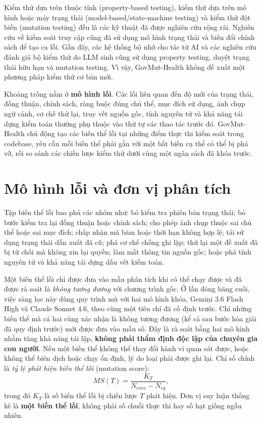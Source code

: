 \documentclass[11pt]{article}
\begin{document}
Kiểm thử dựa trên thuộc tính (property-based testing), kiểm thử dựa trên mô hình hoặc máy trạng thái (model-based/state-machine testing) và kiểm thử đột biến (mutation testing) đều là các kỹ thuật đã được nghiên cứu rộng rãi. Nghiên cứu về kiểm soát truy cập cũng đã sử dụng mô hình trạng thái và biến đổi chính sách để tạo ca lỗi. Gần đây, các hệ thống bộ nhớ cho tác tử AI và các nghiên cứu đánh giá bộ kiểm thử do LLM sinh cũng sử dụng property testing, duyệt trạng thái hữu hạn và mutation testing. Vì vậy, GovMut-Health không đề xuất một phương pháp kiểm thử cơ bản mới.

Khoảng trống nằm ở \textbf{mô hình lỗi}. Các lỗi liên quan đến độ mới của trạng thái, đồng thuận, chính sách, ràng buộc đúng chủ thể, mục đích sử dụng, ảnh chụp ngữ cảnh, cơ chế thử lại, truy vết nguồn gốc, tính nguyên tử và khả năng tái dựng kiểm toán thường phụ thuộc vào thứ tự các thao tác trước đó. GovMut-Health chủ động tạo các biến thể lỗi tại những điểm thực thi kiểm soát trong codebase, yêu cầu mỗi biến thể phải gắn với một bất biến cụ thể có thể bị phá vỡ, rồi so sánh các chiến lược kiểm thử dưới cùng một ngân sách đã khóa trước.

\section{Mô hình lỗi và đơn vị phân tích}
Tập biến thể lỗi bao phủ các nhóm như: bỏ kiểm tra phiên bản trạng thái; bỏ bước kiểm tra lại đồng thuận hoặc chính sách; cho phép ảnh chụp thuộc sai chủ thể hoặc sai mục đích; chấp nhận mã băm hoặc thời hạn không hợp lệ; tái sử dụng trạng thái dẫn xuất đã cũ; phá cơ chế chống ghi lặp; thử lại một đề xuất đã bị từ chối mà không xin lại quyền; làm mất thông tin nguồn gốc; hoặc phá tính nguyên tử và khả năng tái dựng dấu vết kiểm toán.

Một biến thể lỗi chỉ được đưa vào mẫu phân tích khi có thể chạy được và đã được rà soát là \emph{không tương đương} với chương trình gốc. Ở lần đóng băng cuối, việc sàng lọc này dùng quy trình mù với hai mô hình khóa, Gemini 3.6 Flash High và Claude Sonnet 4.6, theo cùng một tiêu chí đã cố định trước. Chỉ những biến thể mà cả hai cùng xác nhận là không tương đương (kể cả sau bước hòa giải đã quy định trước) mới được đưa vào mẫu số. Đây là rà soát bằng hai mô hình nhằm tăng khả năng tái lập, \textbf{không phải thẩm định độc lập của chuyên gia con người}. Nếu một biến thể không thể thay đổi hành vi quan sát được, hoặc không thể biên dịch hoặc chạy ổn định, lý do loại phải được ghi lại. Chỉ số chính là \emph{tỷ lệ phát hiện biến thể lỗi} (mutation score):
\[
MS(T)=\frac{K_T}{N_{exec}-N_{eq}},
\]
trong đó $K_T$ là số biến thể lỗi bị chiến lược $T$ phát hiện. Đơn vị suy luận thống kê là \textbf{một biến thể lỗi}, không phải số chuỗi thực thi hay số hạt giống ngẫu nhiên.
\end{document}

